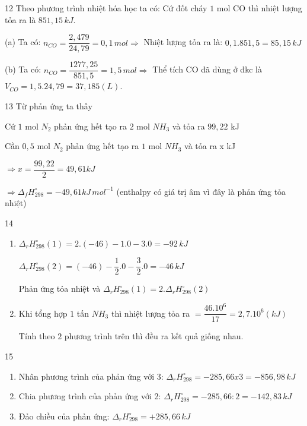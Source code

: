 \def\writeANS{}
\begin{loigiaibth}{12}
  Theo phương trình nhiệt hóa học ta có: Cứ đốt cháy $1$ mol CO thì nhiệt lượng tỏa ra là $851{,}15\, kJ$. \par (a) Ta có: $n_{CO} = \dfrac {2{,}479}{24{,}79} = 0{,}1\, mol \Rightarrow $ Nhiệt lượng tỏa ra là: $0{,}1.851{,}5 = 85{,}15\, kJ$ \par (b) Ta có: $n_{CO} = \dfrac {1277{,}25}{851{,}5} = 1{,}5\, mol \Rightarrow $ Thể tích CO đã dùng ở đkc là $V_{CO} = 1{,}5.24{,}79 = 37{,}185(L)$.
\end{loigiaibth}
\def\writeANS{}
\begin{loigiaibth}{13}
  Từ phản ứng ta thấy \par Cứ $1$ mol $N_2$ phản ứng hết tạo ra $2$ mol $NH_3$ và tỏa ra $99{,}22$ kJ \par Cần $0{,}5$ mol $N_2$ phản ứng hết tạo ra $1$ mol $NH_3$ và tỏa ra x kJ \par $\Rightarrow x = \dfrac {99{,}22}{2} = 49{,}61kJ$ \par $\Rightarrow \Delta _f H_{298}^\circ = -49{,}61kJ\, mol^{-1}$ (enthalpy có giá trị âm vì đây là phản ứng tỏa nhiệt)
\end{loigiaibth}
\def\writeANS{}
\begin{loigiaibth}{14}
  \begin {enumerate} \item [(a)] $\Delta _r H_{298}^\circ (1) = 2.(-46) - 1.0 - 3.0 = -92\, kJ$ \par $\Delta _r H_{298}^\circ (2) = (-46) - \dfrac {1}{2}.0 - \dfrac {3}{2}.0 = -46\, kJ$ \par Phản ứng tỏa nhiệt và $\Delta _r H_{298}^\circ (1) = 2. \Delta _r H_{298}^\circ (2)$ \item [(b)] Khi tổng hợp $1$ tấn $NH_3$ thì nhiệt lượng tỏa ra $= \dfrac {46.10^6}{17} = 2{,}7.10^6 (kJ)$ \par Tính theo $2$ phương trình trên thì đều ra kết quả giống nhau. \end {enumerate}
\end{loigiaibth}
\def\writeANS{}
\begin{loigiaibth}{15}
  \begin {enumerate} \item [(a)] Nhân phương trình của phản ứng với 3: $\Delta _r H_{298}^\circ = -285{,}66 x 3 = -856{,}98\, kJ$ \item [(b)] Chia phương trình của phản ứng với 2: $\Delta _r H_{298}^\circ = -285{,}66 : 2 = -142{,}83\, kJ$ \item [(c)] Đảo chiều của phản ứng: $\Delta _r H_{298}^\circ = +285{,}66\, kJ$ \end {enumerate}
\end{loigiaibth}
